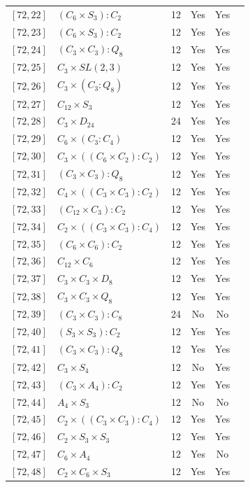 \documentclass[12pt, a4paper]{article}
\theoremstyle{plain}
\theoremstyle{definition}
\begin{document}
\begin{longtable}{llcccl}
  $[72,22]$ & $(C_6 \times S_3) : C_2$ & 12 & Yes & Yes \\
  $[72,23]$ & $(C_6 \times S_3) : C_2$ & 12 & Yes & Yes \\
  $[72,24]$ & $(C_3 \times C_3) : Q_8$ & 12 & Yes & Yes \\
  $[72,25]$ & $C_3 \times SL(2,3)$ & 12 & Yes & Yes \\
  $[72,26]$ & $C_3 \times (C_3 : Q_8)$ & 12 & Yes & Yes \\
  $[72,27]$ & $C_{12} \times S_3$ & 12 & Yes & Yes \\
  $[72,28]$ & $C_3 \times D_{24}$ & 24 & Yes & Yes \\
  $[72,29]$ & $C_6 \times (C_3 : C_4)$ & 12 & Yes & Yes \\
  $[72,30]$ & $C_3 \times ((C_6 \times C_2) : C_2)$ & 12 & Yes & Yes \\
  $[72,31]$ & $(C_3 \times C_3) : Q_8$ & 12 & Yes & Yes \\
  $[72,32]$ & $C_4 \times ((C_3 \times C_3) : C_2)$ & 12 & Yes & Yes \\
  $[72,33]$ & $(C_{12} \times C_3) : C_2$ & 12 & Yes & Yes \\
  $[72,34]$ & $C_2 \times ((C_3 \times C_3) : C_4)$ & 12 & Yes & Yes \\
  $[72,35]$ & $(C_6 \times C_6) : C_2$ & 12 & Yes & Yes \\
  $[72,36]$ & $C_{12} \times C_6$ & 12 & Yes & Yes \\
  $[72,37]$ & $C_3 \times C_3 \times D_8$ & 12 & Yes & Yes \\
  $[72,38]$ & $C_3 \times C_3 \times Q_8$ & 12 & Yes & Yes \\
  $[72,39]$ & $(C_3 \times C_3) : C_8$ & 24 & No & No \\
  $[72,40]$ & $(S_3 \times S_3) : C_2$ & 12 & Yes & Yes \\
  $[72,41]$ & $(C_3 \times C_3) : Q_8$ & 12 & Yes & Yes \\
  $[72,42]$ & $C_3 \times S_4$ & 12 & No & Yes \\
  $[72,43]$ & $(C_3 \times A_4) : C_2$ & 12 & Yes & Yes \\
  $[72,44]$ & $A_4 \times S_3$ & 12 & No & No \\
  $[72,45]$ & $C_2 \times ((C_3 \times C_3) : C_4)$ & 12 & Yes & Yes \\
  $[72,46]$ & $C_2 \times S_3 \times S_3$ & 12 & Yes & Yes \\
  $[72,47]$ & $C_6 \times A_4$ & 12 & Yes & No \\
  $[72,48]$ & $C_2 \times C_6 \times S_3$ & 12 & Yes & Yes \\

\end{longtable}
\end{document}
